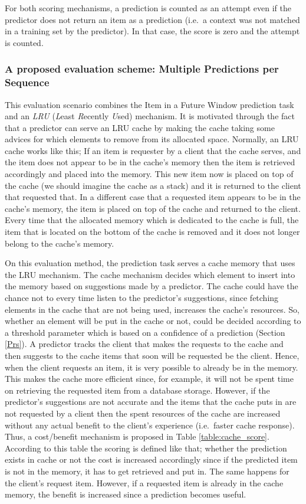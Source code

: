 \par For both scoring mechanisms, a prediction is counted as an attempt even if the predictor does not return an item as a prediction (i.e.\ a context was not matched in a training set by the predictor). In that case, the score is zero and the attempt is counted.

\subsubsection{A proposed evaluation scheme: Multiple Predictions per Sequence}{\label{proposedEv}}
This evaluation scenario combines the Item in a Future Window prediction task and an \emph{LRU} (\emph{L}east \emph{R}ecently \emph{U}sed) mechanism. It is motivated through the fact that a predictor can serve an LRU cache by making the cache taking some advices for which elements to remove from its allocated space. Normally, an LRU cache works like this; If an item is requester by a client that the cache serves, and the item does not appear to be in the cache's memory then the item is retrieved accordingly and placed into the memory. This new item now is placed on top of the cache (we should imagine the cache as a stack) and it is returned to the client that requested that. In a different case that a requested item appears to be in the cache's memory, the item is placed on top of the cache and returned to the client. Every time that the allocated memory which is dedicated to the cache is full, the item that is located on the bottom of the cache is removed and it does not longer belong to the cache's memory.
\par On this evaluation method, the prediction task serves a cache memory that uses the LRU mechanism. The cache mechanism decides which element to insert into the memory based on suggestions made by a predictor. The cache could have the chance not to every time listen to the predictor's suggestions, since fetching elements in the cache that are not being used, increases the cache's resources. So, whether an element will be put in the cache or not, could be decided according to a threshold parameter which is based on a confidence of a prediction (Section \ref{Prs}). A predictor tracks the client that makes the requests to the cache and then suggests to the cache items that soon will be requested be the client. Hence, when the client requests an item, it is very possible to already be in the memory. This makes the cache more efficient since, for example, it will not be spent time on retrieving the requested item from a database storage. However, if the predictor's suggestions are not accurate and the items that the cache puts in are not requested by a client then the spent resources of the cache are increased without any actual benefit to the client's experience (i.e.\ faster cache response). Thus, a cost/benefit mechanism is proposed in Table \ref{table:cache_score}. According to this table the scoring is defined like that; whether the prediction exists in cache or not the cost is increased accordingly since if the predicted item is not in the memory, it has to get retrieved and put in. The same happens for the client's request item. However, if a requested item is already in the cache memory, the benefit is increased since a prediction becomes useful.
